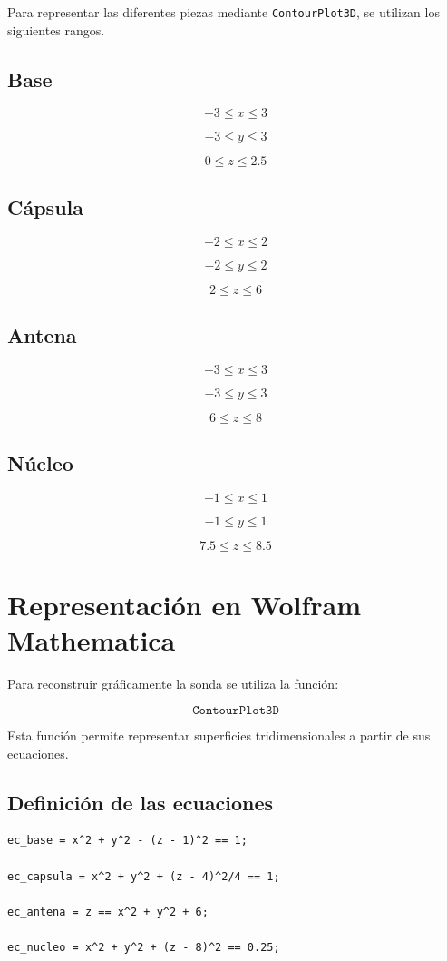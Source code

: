\documentclass[12pt,a4paper]{article}
\begin{document}
Para representar las diferentes piezas mediante \texttt{ContourPlot3D},
se utilizan los siguientes rangos.

\subsection{Base}

\[-3\leq x\leq3\]

\[-3\leq y\leq3\]

\[0\leq z\leq2.5\]

\subsection{Cápsula}

\[-2\leq x\leq2\]

\[-2\leq y\leq2\]

\[2\leq z\leq6\]

\subsection{Antena}

\[-3\leq x\leq3\]

\[-3\leq y\leq3\]

\[6\leq z\leq8\]

\subsection{Núcleo}

\[-1\leq x\leq1\]

\[-1\leq y\leq1\]

\[7.5\leq z\leq8.5\]

\section{Representación en Wolfram Mathematica}

Para reconstruir gráficamente la sonda se utiliza la función:

\[\texttt{ContourPlot3D}\]

Esta función permite representar superficies tridimensionales
a partir de sus ecuaciones.

\subsection{Definición de las ecuaciones}

\begin{lstlisting}
ec_base = x^2 + y^2 - (z - 1)^2 == 1;

ec_capsula = x^2 + y^2 + (z - 4)^2/4 == 1;

ec_antena = z == x^2 + y^2 + 6;

ec_nucleo = x^2 + y^2 + (z - 8)^2 == 0.25;
\end{lstlisting}
\end{document}
